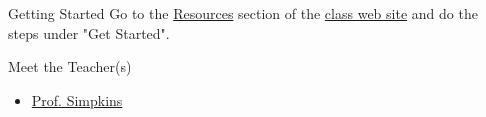 \documentclass[smaller]{beamer}
\begin{document}
\begin{frame}[label=sec-1-3]{Getting Started}
Go to the \href{https://datamastery.github.io/dme/resources.html}{Resources} section of the  \href{https://datamastery.github.io/dme/}{class web site} and do the steps under "Get Started".
\end{frame}

\begin{frame}[label=sec-1-4]{Meet the Teacher(s)}
\begin{itemize}
\item \href{http://cs1331.gatech.edu/slides/meet-simpkins.html}{Prof. Simpkins}
\end{itemize}
\end{frame}
\end{document}

